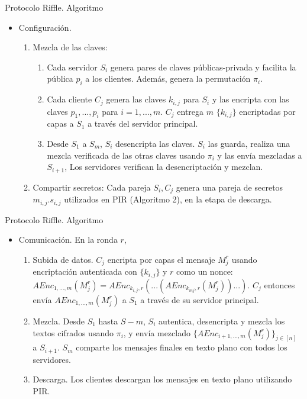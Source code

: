 \documentclass[10pt]{beamer}
\begin{document}
\begin{frame}{Protocolo Riffle. Algoritmo}
	\pause
	\begin{itemize}
		\item Configuración.
		\begin{enumerate}
			\item Mezcla de las claves:
			\begin{enumerate}
				\item Cada servidor $S_i$ genera pares de claves públicas-privada y facilita la pública $p_i$ a los clientes. Además, genera la permutación $\pi_i$.
				\item Cada cliente $C_j$ genera las claves $k_{i,j}$ para $S_i$ y las encripta con las claves $p_1,...,p_i$ para $i=1,...,m$. $C_j$ entrega $m$ $\{k_{i,j}\}$ encriptadas por capas a $S_1$ a través del servidor principal.
				\item Desde $S_1$ a $S_m$, $S_i$ desencripta las claves. $S_i$ las guarda, realiza una mezcla verificada de las otras claves usando $\pi_i$ y las envía mezcladas a $S_{i+1}$, Los servidores verifican la desencriptación y mezclan.
			\end{enumerate}
			\item Compartir secretos: Cada pareja $S_i,C_j$ genera una pareja de secretos $m_{i,j}.s_{i,j}$ utilizados en PIR (Algoritmo 2), en la etapa de descarga.
		\end{enumerate}
	\end{itemize}
\end{frame}

\begin{frame}{Protocolo Riffle. Algoritmo}
	\begin{itemize}
		\item Comunicación. En la ronda $r$,
		\begin{enumerate}
			\item Subida de datos. $C_j$ encripta por capas el mensaje $M_j ^r$ usando encriptación autenticada con $\{k_{i,j}\}$ y $r$ como un nonce: $AEnc_{1,...,m}(M_j ^r) = A Enc_{k_{i,j},r}(...(A Enc_{k_{mj},r}(M_j ^r))...)$. $C_j$ entonces envía $AEnc_{1,...,m}(M_j ^r)$ a $S_1$ a través de su servidor principal.
			\item Mezcla. Desde $S_1$ hasta $S-m$, $S_i$ autentica, desencripta y mezcla los textos cifrados usando $\pi_i$, y envía mezclado $\{AEnc_{i+1,...,m}(M_j ^r)\}_{j \in [n]}$ a $S_{i+1}$. $S_m$ comparte los mensajes finales en texto plano con todos los servidores.
			\item Descarga. Los clientes descargan los mensajes en texto plano utilizando PIR.
		\end{enumerate}
	\end{itemize}
\end{frame}		
		
\end{document}
